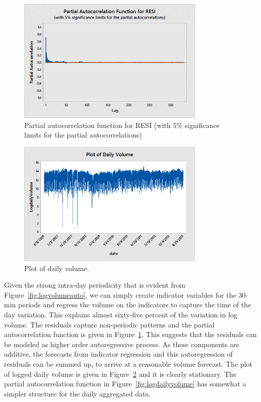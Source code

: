         \begin{figure}[!ht]
        \centering
        \includegraphics[width=0.8\textwidth]{chapters/chapter_stat_ts/figures/resi.png}
        \caption{Partial autocorrelation function for RESI (with 5\% significance limits for the partial autocorrelations) \label{fig:partresi}}
        \end{figure}
        
        \begin{figure}[!ht]
        \centering
        \includegraphics[width=0.8\textwidth]{chapters/chapter_stat_ts/figures/dailyvol.png}
        \caption{Plot of daily volume. \label{fig:dailyvol}}
        \end{figure}


Given the strong intra-day periodicity that is evident from Figure~\ref{fig:logvolumeauto}, we can simply create indicator variables for the 30-min periods and regress the volume on the indicators to capture the time of the day variation. This explains almost sixty-five percent of the variation in log volume. The residuals capture non-periodic patterns and the partial autocorrelation function is given in Figure~\ref{fig:partresi}. This suggests that the residuals can be modeled as higher order autoregressive process. As these components are additive, the forecasts from indicator regression and this autoregression of residuals can be summed up, to arrive at a reasonable volume forecast. The plot of logged daily volume is given in Figure~\ref{fig:dailyvol} and it is clearly stationary. The partial autocorrelation function in Figure~\ref{fig:logdailyvolume} has somewhat a simpler structure for the daily aggregated data. 


